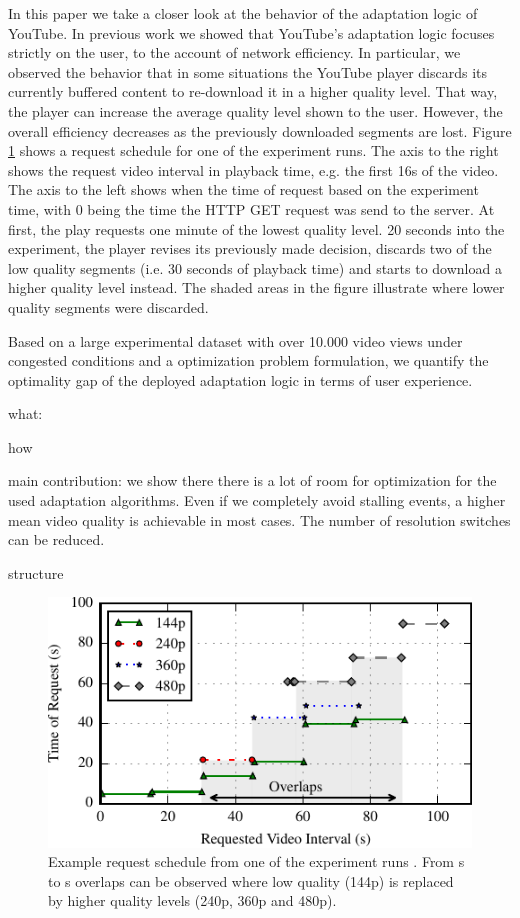 In this paper we take a closer look at the behavior of the adaptation logic of YouTube.
In previous work we showed that YouTube's adaptation logic focuses strictly on the user, to the account of network efficiency.
In particular, we observed the behavior that in some situations the YouTube player discards its currently buffered content to re-download it in a higher quality level.
That way, the player can increase the average quality level shown to the user.
However, the overall efficiency decreases as the previously downloaded segments are lost.
Figure \ref{fig:request_schedule} shows a request schedule for one of the experiment runs.
The axis to the right shows the request video interval in playback time, e.g. the first 16s of the video.
The axis to the left shows when the time of request based on the experiment time, with 0 being the time the HTTP GET request was send to the server.
At first, the play requests one minute of the lowest quality level.
20 seconds into the experiment, the player revises its previously made decision, discards two of the low quality segments (i.e. 30 seconds of playback time) and starts to download a higher quality level instead.
The shaded areas in the figure illustrate where lower quality segments were discarded.

Based on a large experimental dataset with over 10.000 video views under congested conditions and a optimization problem formulation, we quantify the optimality gap of the deployed adaptation logic in terms of user experience.






what:

how

main contribution: we show there there is a lot of room for optimization for the used adaptation algorithms. Even if we completely avoid stalling events, a higher mean video quality is achievable in most cases. The number of resolution switches can be reduced.

structure


\begin{figure}[t]
\centering
\includegraphics[width=0.9\linewidth]{figs/eg_request_schedule}%
\caption{Example request schedule from one of the experiment runs \cite{sieber16sacrificing}. From \unit[30]{s} to \unit[90]{s} overlaps can be observed where low quality (144p) is replaced by higher quality levels (240p, 360p and 480p).}
\label{fig:request_schedule}%
\end{figure}

\cite{sieber16sacrificing,sieber15costaggressive}